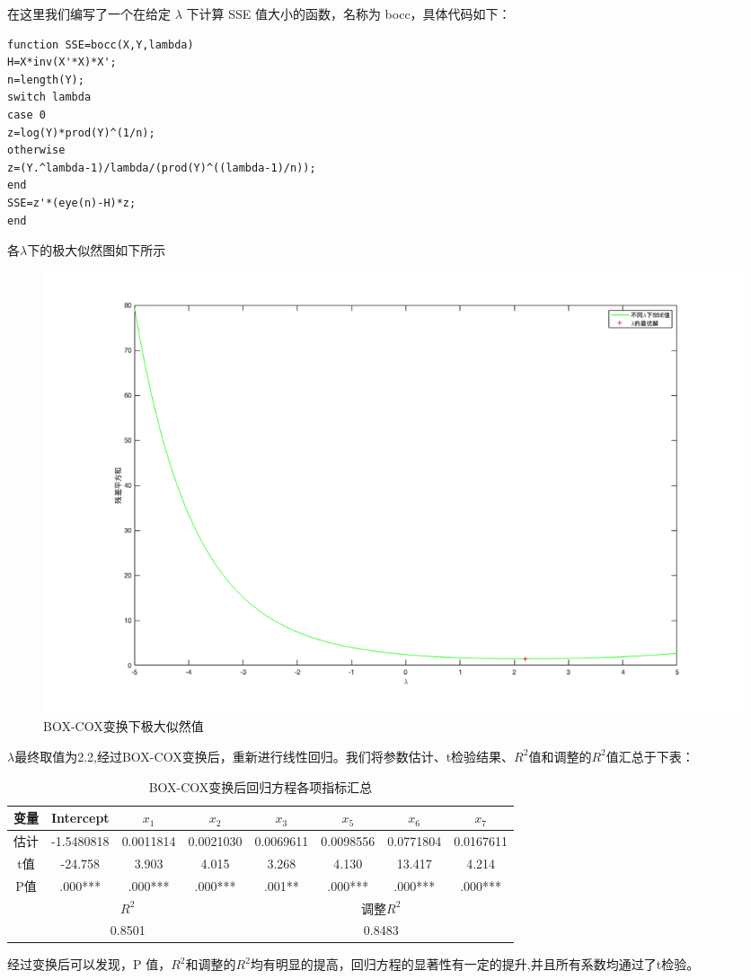 \documentclass[11pt]{article}
\begin{document}
在这里我们编写了一个在给定 $\lambda$ 下计算 SSE 值大小的函数，名称为 bocc，具体代码如下：
\begin{lstlisting}
function SSE=bocc(X,Y,lambda)
H=X*inv(X'*X)*X';
n=length(Y);
switch lambda
case 0
z=log(Y)*prod(Y)^(1/n);
otherwise
z=(Y.^lambda-1)/lambda/(prod(Y)^((lambda-1)/n));
end
SSE=z'*(eye(n)-H)*z;
end
\end{lstlisting}

各$\lambda$下的极大似然图如下所示
\begin{figure}[H]
	\centering
	\caption{BOX-COX变换下极大似然值}
	\includegraphics[scale=0.35]{images/box_cox_plot.png}
\end{figure}
$\lambda$最终取值为2.2,经过BOX-COX变换后，重新进行线性回归。我们将参数估计、t检验结果、$R^2$值和调整的$R^2$值汇总于下表：
\begin{table}[H]
	\centering
	\caption{BOX-COX变换后回归方程各项指标汇总}
	\begin{tabular}{cccccccc}
		\hline\hline
		变量& Intercept& $x_1$    & $x_2$    & $x_3$   &   $x_5$    & $x_6$    & $x_7$  \\
		\hline
		估计	& -1.5480818   &  0.0011814  & 0.0021030   & 0.0069611   & 0.0098556 & 0.0771804   &0.0167611\\
		t值& -24.758    &   3.903  & 4.015   & 3.268     &  4.130  &  13.417   &  4.214  \\
		P值&  .000***
		&.000***  &.000***     &.001**    & .000***   &.000***     & .000***  \\
		\hline\hline
		\multicolumn{4}{c}{$R^2$} & \multicolumn{4}{c}{调整$R^2$} \\
		\hline
		\multicolumn{4}{c}{0.8501}& \multicolumn{4}{c}{0.8483}\\
		\hline\hline
	\end{tabular}
\end{table}
经过变换后可以发现，P 值，$R^2$和调整的$R^2$均有明显的提高，回归方程的显著性有一定的提升,并且所有系数均通过了t检验。
\end{document}
